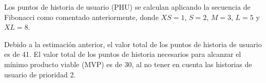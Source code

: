 Los puntos de historia de usuario (PHU) se calculan aplicando la secuencia de
Fibonacci como comentado anteriormente, donde $XS=1$, $S=2$, $M=3$, $L=5$ y
$XL=8$.

Debido a la estimación anterior, el valor total de los puntos de historia de
usuario es de 41. El valor total de los puntos de historia necesarios para
alcanzar el mínimo producto viable (MVP) es de 30, al no tener en cuenta las
historias de usuario de prioridad 2.
